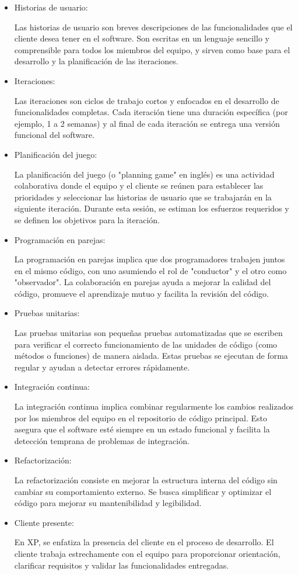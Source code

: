 \documentclass[12pt,a4paper]{article}
\begin{document}
\begin{itemize}
    \item Historias de usuario:\par Las historias de usuario son breves descripciones de las funcionalidades que el cliente desea tener en el software. Son escritas en un lenguaje sencillo y comprensible para todos los miembros del equipo, y sirven como base para el desarrollo y la planificación de las iteraciones.
    \item Iteraciones:\par Las iteraciones son ciclos de trabajo cortos y enfocados en el desarrollo de funcionalidades completas. Cada iteración tiene una duración específica (por ejemplo, 1 a 2 semanas) y al final de cada iteración se entrega una versión funcional del software.
    \item Planificación del juego:\par La planificación del juego (o "planning game" en inglés) es una actividad colaborativa donde el equipo y el cliente se reúnen para establecer las prioridades y seleccionar las historias de usuario que se trabajarán en la siguiente iteración. Durante esta sesión, se estiman los esfuerzos requeridos y se definen los objetivos para la iteración.
    \item Programación en parejas:\par La programación en parejas implica que dos programadores trabajen juntos en el mismo código, con uno asumiendo el rol de "conductor" y el otro como "observador". La colaboración en parejas ayuda a mejorar la calidad del código, promueve el aprendizaje mutuo y facilita la revisión del código.
    \item Pruebas unitarias:\par Las pruebas unitarias son pequeñas pruebas automatizadas que se escriben para verificar el correcto funcionamiento de las unidades de código (como métodos o funciones) de manera aislada. Estas pruebas se ejecutan de forma regular y ayudan a detectar errores rápidamente.
    \item Integración continua:\par La integración continua implica combinar regularmente los cambios realizados por los miembros del equipo en el repositorio de código principal. Esto asegura que el software esté siempre en un estado funcional y facilita la detección temprana de problemas de integración.
    \item Refactorización:\par La refactorización consiste en mejorar la estructura interna del código sin cambiar su comportamiento externo. Se busca simplificar y optimizar el código para mejorar su mantenibilidad y legibilidad.
    \item Cliente presente:\par En XP, se enfatiza la presencia del cliente en el proceso de desarrollo. El cliente trabaja estrechamente con el equipo para proporcionar orientación, clarificar requisitos y validar las funcionalidades entregadas.
    
\end{itemize}
    
\end{document}
